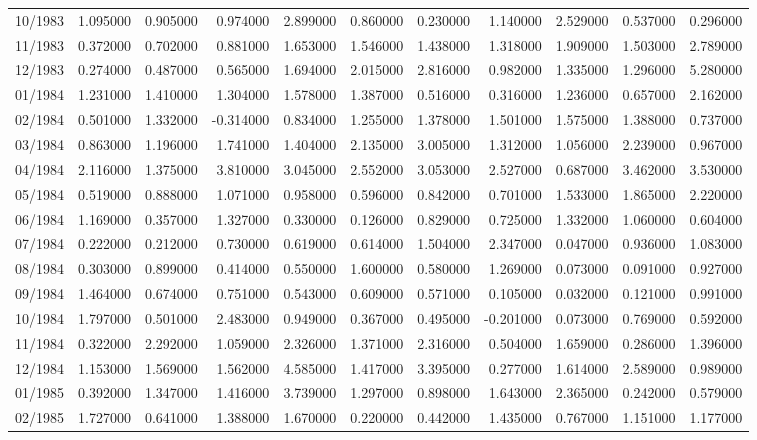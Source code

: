 \begin{tabular}{lrrrrrrrrrr}
10/1983 & 1.095000 & 0.905000 & 0.974000 & 2.899000 & 0.860000 & 0.230000 & 1.140000 & 2.529000 & 0.537000 & 0.296000 \\
11/1983 & 0.372000 & 0.702000 & 0.881000 & 1.653000 & 1.546000 & 1.438000 & 1.318000 & 1.909000 & 1.503000 & 2.789000 \\
12/1983 & 0.274000 & 0.487000 & 0.565000 & 1.694000 & 2.015000 & 2.816000 & 0.982000 & 1.335000 & 1.296000 & 5.280000 \\
01/1984 & 1.231000 & 1.410000 & 1.304000 & 1.578000 & 1.387000 & 0.516000 & 0.316000 & 1.236000 & 0.657000 & 2.162000 \\
02/1984 & 0.501000 & 1.332000 & -0.314000 & 0.834000 & 1.255000 & 1.378000 & 1.501000 & 1.575000 & 1.388000 & 0.737000 \\
03/1984 & 0.863000 & 1.196000 & 1.741000 & 1.404000 & 2.135000 & 3.005000 & 1.312000 & 1.056000 & 2.239000 & 0.967000 \\
04/1984 & 2.116000 & 1.375000 & 3.810000 & 3.045000 & 2.552000 & 3.053000 & 2.527000 & 0.687000 & 3.462000 & 3.530000 \\
05/1984 & 0.519000 & 0.888000 & 1.071000 & 0.958000 & 0.596000 & 0.842000 & 0.701000 & 1.533000 & 1.865000 & 2.220000 \\
06/1984 & 1.169000 & 0.357000 & 1.327000 & 0.330000 & 0.126000 & 0.829000 & 0.725000 & 1.332000 & 1.060000 & 0.604000 \\
07/1984 & 0.222000 & 0.212000 & 0.730000 & 0.619000 & 0.614000 & 1.504000 & 2.347000 & 0.047000 & 0.936000 & 1.083000 \\
08/1984 & 0.303000 & 0.899000 & 0.414000 & 0.550000 & 1.600000 & 0.580000 & 1.269000 & 0.073000 & 0.091000 & 0.927000 \\
09/1984 & 1.464000 & 0.674000 & 0.751000 & 0.543000 & 0.609000 & 0.571000 & 0.105000 & 0.032000 & 0.121000 & 0.991000 \\
10/1984 & 1.797000 & 0.501000 & 2.483000 & 0.949000 & 0.367000 & 0.495000 & -0.201000 & 0.073000 & 0.769000 & 0.592000 \\
11/1984 & 0.322000 & 2.292000 & 1.059000 & 2.326000 & 1.371000 & 2.316000 & 0.504000 & 1.659000 & 0.286000 & 1.396000 \\
12/1984 & 1.153000 & 1.569000 & 1.562000 & 4.585000 & 1.417000 & 3.395000 & 0.277000 & 1.614000 & 2.589000 & 0.989000 \\
01/1985 & 0.392000 & 1.347000 & 1.416000 & 3.739000 & 1.297000 & 0.898000 & 1.643000 & 2.365000 & 0.242000 & 0.579000 \\
02/1985 & 1.727000 & 0.641000 & 1.388000 & 1.670000 & 0.220000 & 0.442000 & 1.435000 & 0.767000 & 1.151000 & 1.177000 \\

\end{tabular}
